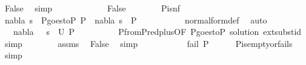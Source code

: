 \begin{isabellebody}
\ False\ \isamarkupfalse%
\ simp\isanewline
\ \ \ \ \isamarkupfalse%
\isanewline
\ \ \ \ \ \ \isamarkupfalse%
\ False\isanewline
\ \ \ \ \ \ \isamarkupfalse%
\ P{\isacharunderscore}{\kern0pt}is{\isacharunderscore}{\kern0pt}nf\isanewline
\ \ \ \ \ \ \isamarkupfalse%
\ nabla\ s\ \ P{}{\isacharunderscore}{\kern0pt}goes{\isacharunderscore}{\kern0pt}to{\isacharunderscore}{\kern0pt}P{\isacharcolon}{\kern0pt}\ {\isachardoublequoteopen}P{}\ {\isasymTurnstile}\ {\isacharparenleft}{\kern0pt}nabla{\isacharcomma}{\kern0pt}\ s{\isacharparenright}{\kern0pt}\ {\isasymRightarrow}\ P{\isachardoublequoteclose}\ \isanewline
\ \ \ \ \ \ \ \ \isamarkupfalse%
\ normal{\isacharunderscore}{\kern0pt}form{\isacharunderscore}{\kern0pt}def\ \isamarkupfalse%
\ auto\isanewline
\ \ \ \ \ \ \isamarkupfalse%
\ {\isachardoublequoteopen}{\isacharparenleft}{\kern0pt}{\isacharbraceleft}{\kern0pt}{\isacharbraceright}{\kern0pt}\ {\isasymunion}\ nabla{\isacharcomma}{\kern0pt}\ {\isacharbrackleft}{\kern0pt}{\isacharbrackright}{\kern0pt}\ {\isasymbullet}\ s{\isacharparenright}{\kern0pt}\ {\isasymin}\ U\ P{}{\isachardoublequoteclose}\isanewline
\ \ \ \ \ \ \ \ \isamarkupfalse%
\ P{}{\isacharunderscore}{\kern0pt}from{\isacharunderscore}{\kern0pt}P{}{\isacharunderscore}{\kern0pt}red{\isacharunderscore}{\kern0pt}plus{\isacharbrackleft}{\kern0pt}OF\ P{}{\isacharunderscore}{\kern0pt}goes{\isacharunderscore}{\kern0pt}to{\isacharunderscore}{\kern0pt}P\ solution\ ext{\isacharunderscore}{\kern0pt}subst{\isacharunderscore}{\kern0pt}id{\isacharbrackright}{\kern0pt}\ \isamarkupfalse%
\ simp\isanewline
\ \ \ \ \ \ \isamarkupfalse%
\ assms\ \isamarkupfalse%
\ False\ \isamarkupfalse%
\ simp\isanewline
\ \ \ \ \isamarkupfalse%
\isanewline
\ \ \isamarkupfalse%
\isanewline
\ \ \isamarkupfalse%
\ {\isachardoublequoteopen}fail\ P{\isachardoublequoteclose}\isanewline
\ \ \ \ \isamarkupfalse%
\ P{\isacharunderscore}{\kern0pt}is{\isacharunderscore}{\kern0pt}empty{\isacharunderscore}{\kern0pt}or{\isacharunderscore}{\kern0pt}fails\ \isamarkupfalse%
\ simp\isanewline
{}\isamarkupfalse%
%
\endisatagproof
{\isafoldproof}%
%
\isadelimproof
\isanewline
%
\endisadelimproof

\end{isabellebody}
